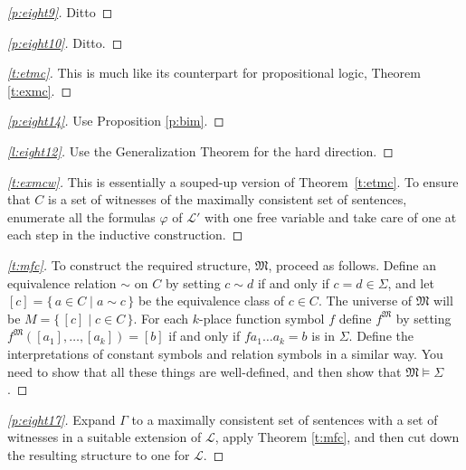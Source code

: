 \documentclass[12pt]{amsbook}
\theoremstyle{plain}
\theoremstyle{definition}
\theoremstyle{remark}
\newenvironment{clue}[1]%
{\begin{proof}[\ref{#1}]}%
{\renewcommand{\qed}{}\end{proof}}
\begin{document}
\begin{clue}{p:eight9}
Ditto
\end{clue}

\begin{clue}{p:eight10}
Ditto.
\end{clue}

\begin{clue}{t:etmc}
This is much like its counterpart for propositional logic,  Theorem \ref{t:exmc}.
\end{clue}

\begin{clue}{p:eight14}
Use Proposition \ref{p:bim}.
\end{clue}

\begin{clue}{l:eight12}
Use the Generalization Theorem for the hard direction.
\end{clue}

\begin{clue}{t:exmcw}
This is essentially a souped-up version of Theorem~\ref{t:etmc}.  To ensure that $C$ is a set of witnesses of the maximally consistent set of sentences,  enumerate all the formulas $\varphi$ of $\mathcal{L}'$ with one free variable and take care of one at each step in the inductive construction.
\end{clue}

\begin{clue}{t:mfc}
To construct the required structure,  $\mathfrak{M}$,  proceed as follows.  Define an equivalence relation $\sim$ on $C$ by setting $c \sim d$ if and only if $c = d \in \Sigma$,  and let $[c] = \{\, a \in C \mid a \sim c \,\}$ be the equivalence class of $c \in C$.  The universe of $\mathfrak{M}$ will be $M = \{\, [c] \mid c \in C \,\}$.  For each $k$-place function symbol $f$ define $f^{\mathfrak{M}}$ by setting $f^{\mathfrak{M}}([a_1], \dots, [a_k]) =[b]$ if and only if $fa_1\dots a_k = b$ is in $\Sigma$.  Define the interpretations of constant symbols and relation symbols in a similar way.  You need to show that all these things are well-defined,  and then show that $\mathfrak{M} \models \Sigma$.
\end{clue}

\begin{clue}{p:eight17}
Expand $\Gamma$ to a maximally consistent set of sentences with a set of witnesses in a suitable extension of $\mathcal{L}$, apply Theorem \ref{t:mfc},  and then cut down the resulting structure to one for $\mathcal{L}$.
\end{clue}
\end{document}
